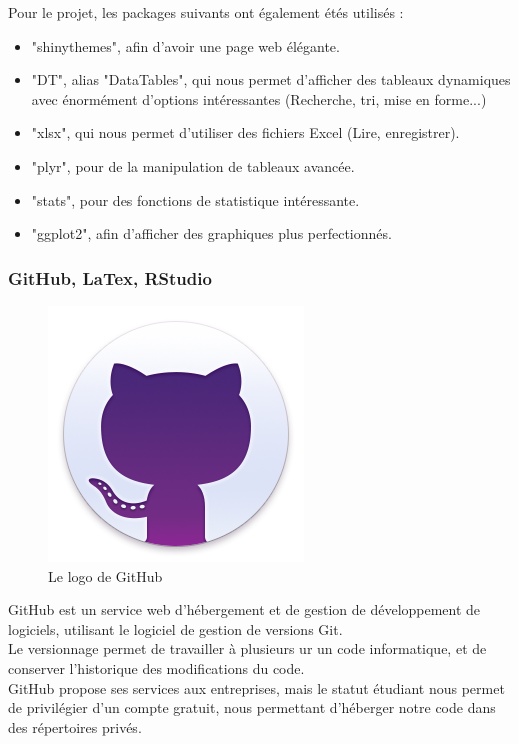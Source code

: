\documentclass[12pt,a4paper]{report}
\begin{document}
Pour le projet, les packages suivants ont également étés utilisés :

\begin{itemize} 
	\item "shinythemes", afin d'avoir une page web élégante.
	\item "DT", alias "DataTables", qui nous permet d'afficher des tableaux dynamiques avec énormément d'options intéressantes (Recherche, tri, mise en forme...)
	\item "xlsx", qui nous permet d'utiliser des fichiers Excel (Lire, enregistrer).
	\item "plyr", pour de la manipulation de tableaux avancée.
	\item "stats", pour des fonctions de statistique intéressante.
	\item "ggplot2", afin d'afficher des graphiques plus perfectionnés.
\end{itemize}

\newpage
\subsubsection {GitHub, LaTex, RStudio}

\begin{figure}[!h]
	\center
	\includegraphics[scale=0.2]{img/desktop-logo.png}
	\caption {Le logo de GitHub}
\end{figure}
GitHub est un service web d'hébergement et de gestion de développement de logiciels, utilisant le logiciel de gestion de versions Git. \\
Le versionnage permet de travailler à plusieurs ur un code informatique, et de conserver l'historique des modifications du code. \\
GitHub propose ses services aux entreprises, mais le statut étudiant nous permet de privilégier d'un compte gratuit, nous permettant d'héberger notre code dans des répertoires privés.\\
\end{document}
